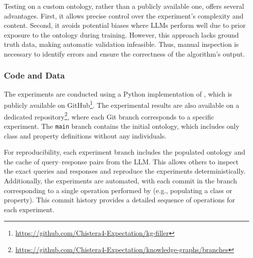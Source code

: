 %
Testing \llmfkg{} on a custom ontology, rather than a publicly available one, offers several advantages.
%
First, it allows precise control over the experiment's complexity and content.
%
Second, it avoids potential biases where \glspl{LLM} perform well due to prior exposure to the ontology during training.
%
However, this approach lacks ground truth data, making automatic validation infeasible.
%
Thus, manual inspection is necessary to identify errors and ensure the correctness of the algorithm's output.

%
\subsubsection{Code and Data}
\label{subsubsec:code-and-data}
%
The experiments are conducted using a Python implementation of \llmfkg{}, which is publicly available on GitHub\footnote{\url{https://github.com/Chistera4-Expectation/kg-filler}}.
%
The experimental results are also available on a dedicated repository\footnote{\url{https://github.com/Chistera4-Expectation/knowledge-graphs/branches}}, where each Git branch corresponds to a specific experiment.
%
The \texttt{main} branch contains the initial ontology, which includes only class and property definitions without any individuals.

%
For reproducibility, each experiment branch includes the populated ontology and the cache of query--response pairs from the \gls{LLM}.
%
This allows others to inspect the exact queries and responses and reproduce the experiments deterministically.
%
Additionally, the experiments are automated, with each commit in the branch corresponding to a single operation performed by \llmfkg{} (e.g., populating a class or property).
%
This commit history provides a detailed sequence of operations for each experiment.

%
